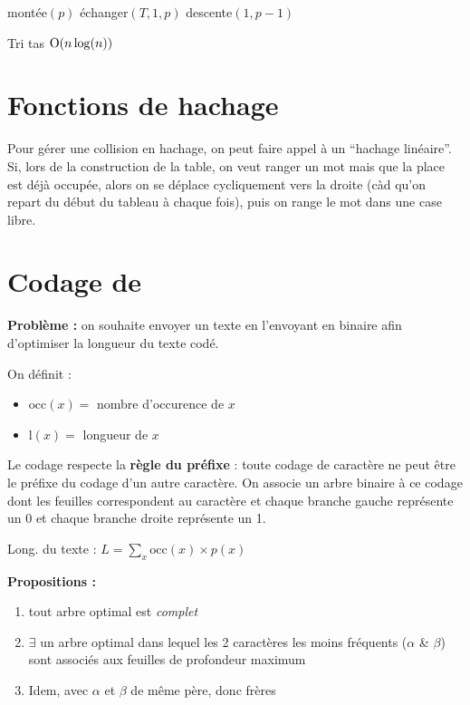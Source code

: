 \documentclass[a4paper, 8pt]{article}
\begin{document}
\begin{multicols*}{3}
\begin{algorithm}[H]
  {
  	montée$(p)$ \;
  }
  {
  	échanger$(T,1,p)$ \;
  	descente$(1,p-1)$ \;
  }
 \caption{Tri tas $\text{O}(n\log(n))$}
\end{algorithm}

\section*{Fonctions de hachage}

Pour gérer une collision en hachage, on peut faire appel à un  \enquote{hachage linéaire}. Si, lors de la construction de la table, on veut ranger un mot mais que la place est déjà occupée, alors on se déplace cycliquement vers la droite (càd qu'on repart du début du tableau à chaque fois), puis on range le mot dans une case libre.

\section*{Codage de }

\textbf{Problème :} on souhaite envoyer un texte en l'envoyant en binaire afin d'optimiser la longueur du texte codé.

\newcommand{\occ}{\text{occ}}
\newcommand{\lng}{\text{l}}
On définit :
\begin{itemize}
\item $\occ(x) =$ nombre d'occurence de $x$
\item $\lng(x) =$ longueur de $x$
\end{itemize}

Le codage respecte la \textbf{règle du préfixe} : toute codage de caractère ne peut être le préfixe du codage d'un autre caractère. On associe un arbre binaire à ce codage dont les feuilles correspondent au caractère et chaque branche gauche représente un 0 et chaque branche droite représente un 1.

Long. du texte :
$L = \sum_{x}{\occ(x)\times p(x)}$

\textbf{Propositions :}
\begin{enumerate}
\item tout arbre optimal est \emph{complet}
\item $\exists$ un arbre optimal dans lequel les 2 caractères les moins fréquents ($\alpha$ \& $\beta$) sont associés aux feuilles de profondeur maximum
\item Idem, avec $\alpha$ et $\beta$ de même père, donc frères
\end{enumerate}


\end{multicols*}
\end{document}

